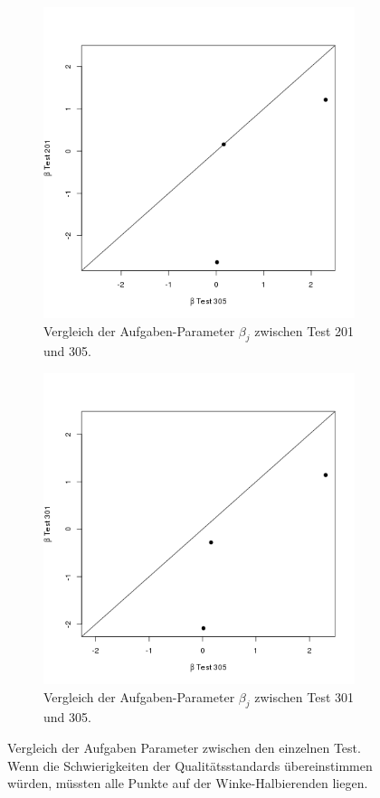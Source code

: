 \begin{figure}[htp]
\begin{subfigure}{0.32\textwidth}
    \includegraphics[width=1.0\linewidth]{graphics/GOF201305.png}
    \caption{Vergleich der Aufgaben-Parameter $\beta_j$ zwischen Test 201 und 305.}
    \label{fig:cor201305}
  \end{subfigure}
  \begin{subfigure}{0.32\textwidth}
    \includegraphics[width=1.0\linewidth]{graphics/GOF301305.png}
    \caption{Vergleich der Aufgaben-Parameter $\beta_j$ zwischen Test 301 und 305.}
    \label{fig:cor301305}
  \end{subfigure}
  
  \caption{Vergleich der Aufgaben Parameter zwischen den einzelnen Test. Wenn die Schwierigkeiten der Qualitätsstandards übereinstimmen würden, müssten alle Punkte auf der Winke-Halbierenden liegen.}
  \label{fig:corTestQ}
  \end{figure}
 
